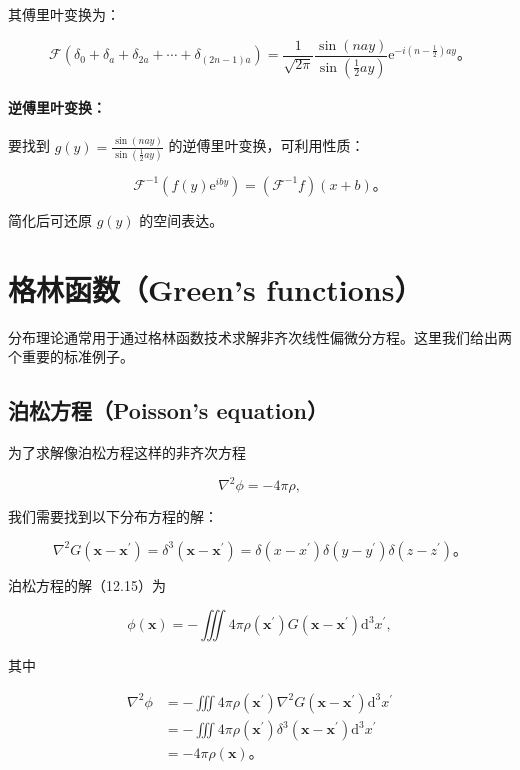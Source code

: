其傅里叶变换为：

$$
\mathcal{F}\left(\delta_{0} + \delta_{a} + \delta_{2a} + \cdots + \delta_{(2n-1)a}\right) = \frac{1}{\sqrt{2 \pi}} \frac{\sin(n a y)}{\sin(\frac{1}{2} a y)} \mathrm{e}^{-i(n-\frac{1}{2}) a y}。
$$

\paragraph{逆傅里叶变换：}\label{ux9006ux5085ux91ccux53f6ux53d8ux6362}

要找到 $g(y) = \frac{\sin(n a y)}{\sin(\frac{1}{2} a y)}$
的逆傅里叶变换，可利用性质：

$$
\mathcal{F}^{-1}\left(f(y) \mathrm{e}^{i b y}\right) = \left(\mathcal{F}^{-1}f\right)(x+b)。
$$

简化后可还原 $g(y)$ 的空间表达。

\section{格林函数（Green's
functions）}\label{sec:12.4}

分布理论通常用于通过格林函数技术求解非齐次线性偏微分方程。这里我们给出两个重要的标准例子。

\subsection{泊松方程（Poisson's
equation）}

为了求解像泊松方程这样的非齐次方程

\begin{equation}\label{eq:12.15} 
 \nabla^{2} \phi=-4 \pi \rho, 
 \end{equation}

我们需要找到以下分布方程的解：

\begin{equation}\label{eq:12.16} 
 \nabla^{2} G\left(\mathbf{x}-\mathbf{x}^{\prime}\right)=\delta^{3}\left(\mathbf{x}-\mathbf{x}^{\prime}\right)=\delta\left(x-x^{\prime}\right) \delta\left(y-y^{\prime}\right) \delta\left(z-z^{\prime}\right)。 
 \end{equation}

泊松方程的解（12.15）为

$$
\phi(\mathbf{x})=-\iiint 4 \pi \rho\left(\mathbf{x}^{\prime}\right) G\left(\mathbf{x}-\mathbf{x}^{\prime}\right) \mathrm{d}^{3} x^{\prime},
$$

其中

$$
\begin{aligned}
\nabla^{2} \phi & =-\iiint 4 \pi \rho\left(\mathbf{x}^{\prime}\right) \nabla^{2} G\left(\mathbf{x}-\mathbf{x}^{\prime}\right) \mathrm{d}^{3} x^{\prime} \\
& =-\iiint 4 \pi \rho\left(\mathbf{x}^{\prime}\right) \delta^{3}\left(\mathbf{x}-\mathbf{x}^{\prime}\right) \mathrm{d}^{3} x^{\prime} \\
& =-4 \pi \rho(\mathbf{x})。
\end{aligned}
$$

